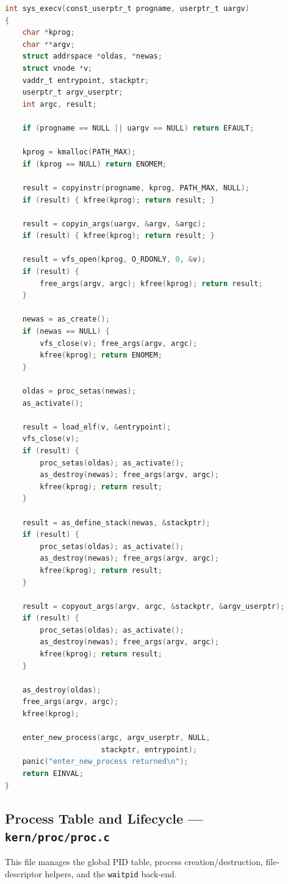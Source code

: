 \documentclass[11pt,a4paper]{article}
\begin{document}
\begin{lstlisting}[language=C,
  caption={\texttt{sys\_execv} --- replace the current address space
           with a new executable image.}]
int sys_execv(const_userptr_t progname, userptr_t uargv)
{
	char *kprog;
	char **argv;
	struct addrspace *oldas, *newas;
	struct vnode *v;
	vaddr_t entrypoint, stackptr;
	userptr_t argv_userptr;
	int argc, result;

	if (progname == NULL || uargv == NULL) return EFAULT;

	kprog = kmalloc(PATH_MAX);
	if (kprog == NULL) return ENOMEM;

	result = copyinstr(progname, kprog, PATH_MAX, NULL);
	if (result) { kfree(kprog); return result; }

	result = copyin_args(uargv, &argv, &argc);
	if (result) { kfree(kprog); return result; }

	result = vfs_open(kprog, O_RDONLY, 0, &v);
	if (result) {
		free_args(argv, argc); kfree(kprog); return result;
	}

	newas = as_create();
	if (newas == NULL) {
		vfs_close(v); free_args(argv, argc);
		kfree(kprog); return ENOMEM;
	}

	oldas = proc_setas(newas);
	as_activate();

	result = load_elf(v, &entrypoint);
	vfs_close(v);
	if (result) {
		proc_setas(oldas); as_activate();
		as_destroy(newas); free_args(argv, argc);
		kfree(kprog); return result;
	}

	result = as_define_stack(newas, &stackptr);
	if (result) {
		proc_setas(oldas); as_activate();
		as_destroy(newas); free_args(argv, argc);
		kfree(kprog); return result;
	}

	result = copyout_args(argv, argc, &stackptr, &argv_userptr);
	if (result) {
		proc_setas(oldas); as_activate();
		as_destroy(newas); free_args(argv, argc);
		kfree(kprog); return result;
	}

	as_destroy(oldas);
	free_args(argv, argc);
	kfree(kprog);

	enter_new_process(argc, argv_userptr, NULL,
	                  stackptr, entrypoint);
	panic("enter_new_process returned\n");
	return EINVAL;
}
\end{lstlisting}

\FloatBarrier
\newpage
\subsection{Process Table and Lifecycle ---
            \texttt{kern/proc/proc.c}}
This file manages the global PID table, process creation/destruction,
file-descriptor helpers, and the \texttt{waitpid} back-end.
\end{document}
